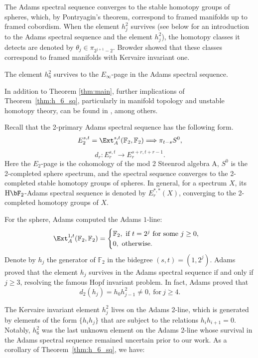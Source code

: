 \documentclass{amsart}
\numberwithin{equation}{section}
\newcommand{\HF}{\mathrm{H}\bF_2}
\begin{document}
The Adams spectral sequence \cite{Adams58} converges to the stable homotopy groups of spheres, which, by Pontryagin's theorem, correspond to framed manifolds up to framed cobordism. When the element $h_j^2$ survives (see below for an introduction to the Adams spectral sequence and the element $h_j^2$), the homotopy classes it detects are denoted by $\theta_j \in \pi_{2^{j+1}-2}$. Browder showed that these classes correspond to framed manifolds with Kervaire invariant one. 

\begin{theorem} \label{thm:h_6_sq}\label{thm:h62}
    The element $h_6^2$ survives to the $E_\infty$-page in the Adams spectral sequence.
\end{theorem}

In addition to Theorem \ref{thm:main}, further implications of Theorem~\ref{thm:h_6_sq}, particularly in manifold topology and unstable homotopy theory, can be found in \cite{MillerHHR, MahowaldRemark, HHR, BJMinduction}, among others. 


Recall that the 2-primary Adams spectral sequence has the following form.
$$E_2^{s,t} = \Ext^{s, t}_A(\mathbb{F}_2, \mathbb{F}_2) \Longrightarrow \pi_{t-s} {S^0},$$
$$d_r: E_r^{s,t} \longrightarrow E_r^{s+r, t+r-1}.$$
Here the $E_2$-page is the cohomology of the mod 2 Steenrod algebra A, $S^0$ is the 2-completed sphere spectrum, and the spectral sequence converges to the 2-completed stable homotopy groups of spheres. In general, for a spectrum $X$, its $\HF$-Adams spectral sequence is denoted by $E_r^{*,*}(X)$, converging to the 2-completed homotopy groups of $X$.

For the sphere, Adams \cite{Adams58} computed the Adams $1$-line: 
$$\Ext^{1,t}_A(\mathbb{F}_2, \mathbb{F}_2) = \begin{cases}
 	\mathbb{F}_2, \ \text{if} \ t = 2^j \ \text{for some} \ j \geq 0, \\
 	0, \ \text{otherwise}.
\end{cases}
$$
Denote by $h_j$ the generator of $\mathbb{F}_2$ in the bidegree $(s, t)=(1, 2^j)$. Adams \cite{Adams60} proved that the element $h_j$ survives in the Adams spectral sequence if and only if $j \geq 3$, resolving the famous Hopf invariant problem. In fact, Adams proved that
$$d_2(h_j) = h_0h_{j-1}^2 \neq 0, \ \text{for} \ j \geq 4.$$

The Kervaire invariant element $h_j^2$ lives on the Adams 2-line, which is generated by elements of the form $\{h_ih_j\}$ that are subject to the relations $h_ih_{i+1} = 0$. Notably, $h_6^2$ was the last unknown element on the Adams 2-line whose survival in the Adams spectral sequence remained uncertain prior to our work. As a corollary of Theorem~\ref{thm:h_6_sq}, we have:
\end{document}
